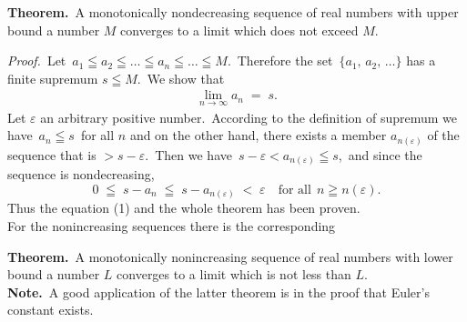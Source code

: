 \documentclass[12pt]{article}
\theoremstyle{definition}
\begin{document}

\textbf{Theorem.}\, A monotonically nondecreasing sequence of real numbers with upper bound a number $M$ converges to a limit which does not exceed $M$.

{\em Proof.}\, Let\, $a_1 \leqq a_2 \leqq \ldots \leqq a_n \leqq \ldots \leqq M$.\, Therefore the set \,$\{a_1,\,a_2,\,\ldots\}$ has a finite supremum $s \leqq M$.\, We show that
\begin{align}                       
\lim_{n\to\infty}a_n \;=\; s.
\end{align}
Let $\varepsilon$ an arbitrary positive number.\, According to the definition of supremum we have\, $a_n \leqq s$\, for all $n$ and on the other hand, there exists a member $a_{n(\varepsilon)}$ of the sequence that is $> s-\varepsilon$.\, Then we have\, $s-\varepsilon < a_{n(\varepsilon)} \leqq s$,\, and since the sequence is nondecreasing,
      $$0 \;\leqq\; s-a_n \;\leqq\; s\!-\!a_{n(\varepsilon)} \;<\; \varepsilon \quad \mbox{for all}\;\, n \geqq n(\varepsilon).$$
Thus the equation (1) and the whole theorem has been proven.\\


For the nonincreasing sequences there is the corresponding

\textbf{Theorem.}\, A monotonically nonincreasing sequence of real numbers with lower bound a number $L$ converges to a limit which is not less than $L$.\\

\textbf{Note.}\, A good application of the latter theorem is in the proof that Euler's constant exists.

\end{document}
